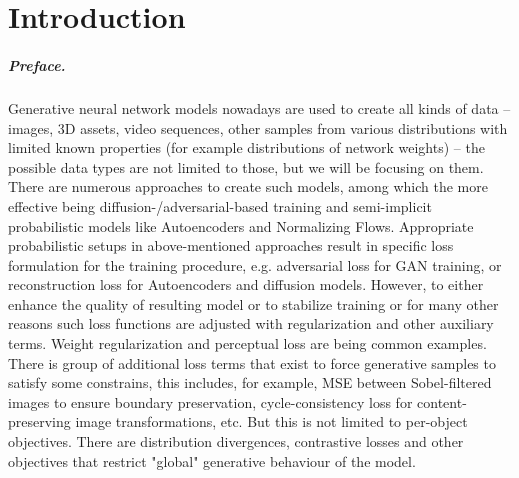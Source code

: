 \chapter{Introduction}

\paragraph{Preface.}
Generative neural network models nowadays are used to create all kinds of data -- images, 3D assets, video sequences, other samples from various distributions with limited known properties (for example distributions of network weights) -- the possible data types are not limited to those, but we will be focusing on them. There are numerous approaches to create such models, among which the more effective being diffusion-/adversarial-based training and semi-implicit probabilistic models like Autoencoders and Normalizing Flows. Appropriate probabilistic setups in above-mentioned approaches result in specific loss formulation for the training procedure, e.g. adversarial loss for GAN training, or reconstruction loss for Autoencoders and diffusion models. However, to either enhance the quality of resulting model or to stabilize training or for many other reasons such loss functions are adjusted with regularization and other auxiliary terms. Weight regularization and perceptual loss are being common examples. There is group of additional loss terms that exist to force generative samples to satisfy some constrains, this includes, for example, MSE between Sobel-filtered images to ensure boundary preservation, cycle-consistency loss for content-preserving image transformations, etc. But this is not limited to per-object objectives. There are distribution divergences, contrastive losses and other objectives that restrict "global" generative behaviour of the model.

